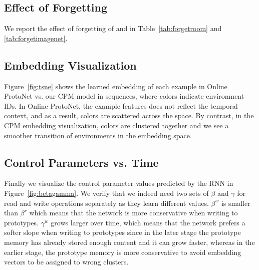 \subsection{Effect of Forgetting}
We report the effect of forgetting of \ourroom{} and \ourimg{} in Table~\ref{tab:forgetroom} and \ref{tab:forgetimagenet}.



\subsection{Embedding Visualization} 
Figure~\ref{fig:tsne} shows the learned embedding of each example in Online ProtoNet vs. our CPM
model in \ourchar{} sequences, where colors indicate environment IDs. In Online ProtoNet, the
example features does not reflect the temporal context, and as a result, colors are scattered across
the space. By contrast, in the CPM embedding visualization, colors are clustered together and we see
a smoother transition of environments in the embedding space.



\subsection{Control Parameters vs. Time}
Finally we visualize the control parameter values predicted by the RNN in
Figure~\ref{fig:betagamma}. We verify that we indeed need two sets of $\beta$ and $\gamma$ for read
and write operations separately as they learn different values. $\beta^w$ is smaller than $\beta^r$
which means that the network is more conservative when writing to prototypes. $\gamma^w$ grows
larger over time, which means that the network prefers a softer slope when writing to prototypes
since in the later stage the prototype memory has already stored enough content and it can grow
faster, whereas in the earlier stage, the prototype memory is more conservative to avoid embedding
vectors to be assigned to wrong clusters.


